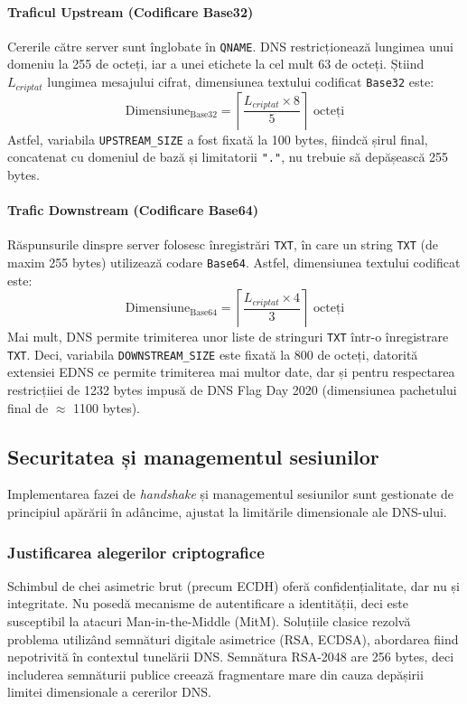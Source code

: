 \paragraph{Traficul Upstream (Codificare Base32)}
Cererile către server sunt înglobate în \texttt{QNAME}. DNS restricționează lungimea unui domeniu la 255 de octeți, iar a unei etichete la cel mult 63 de octeți. Știind $L_{criptat}$ lungimea mesajului cifrat, dimensiunea textului codificat \texttt{Base32} este:
$$ \text{Dimensiune}_{\text{Base32}} = \left\lceil \frac{L_{criptat} \times 8}{5} \right\rceil \text{ octeți} $$
Astfel, variabila \texttt{UPSTREAM\_SIZE} a fost fixată la 100 bytes, fiindcă șirul final, concatenat cu domeniul de bază și limitatorii \texttt{"."}, nu trebuie să depășească 255 bytes.

\paragraph{Trafic Downstream (Codificare Base64)}
Răspunsurile dinspre server folosesc înregistrări \texttt{TXT}, în care un string \texttt{TXT} (de maxim 255 bytes) utilizează codare \texttt{Base64}. Astfel, dimensiunea textului codificat este:
$$ \text{Dimensiune}_{\text{Base64}} = \left\lceil \frac{L_{criptat} \times 4}{3} \right\rceil \text{ octeți} $$
Mai mult, DNS permite trimiterea unor liste de stringuri \texttt{TXT} într-o înregistrare \texttt{TXT}. Deci, variabila \texttt{DOWNSTREAM\_SIZE} este fixată la 800 de octeți, datorită extensiei EDNS ce permite trimiterea mai multor date, dar și pentru respectarea restricțiiei de 1232 bytes impusă de DNS Flag Day 2020 (dimensiunea pachetului final de $\approx$ 1100 bytes).

\subsection{Securitatea și managementul sesiunilor}
Implementarea fazei de \textit{handshake} și managementul sesiunilor sunt gestionate de principiul apărării în adâncime, ajustat la limitările dimensionale ale DNS-ului. 

\subsubsection{Justificarea alegerilor criptografice}
Schimbul de chei asimetric brut (precum ECDH) oferă confidențialitate, dar nu și integritate. Nu posedă mecanisme de autentificare a identității, deci este susceptibil la atacuri Man-in-the-Middle (MitM). Soluțiile clasice rezolvă problema utilizând semnături digitale asimetrice (RSA, ECDSA), abordarea fiind nepotrivită în contextul tunelării DNS. Semnătura RSA-2048 are 256 bytes, deci includerea semnăturii publice creează fragmentare mare din cauza depășirii limitei dimensionale a cererilor DNS.

